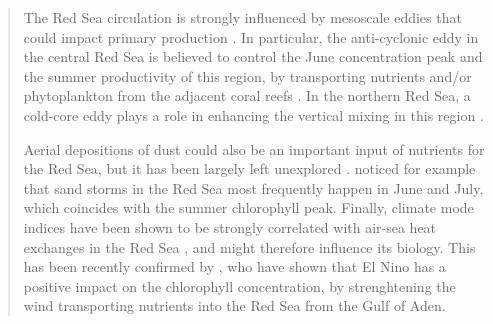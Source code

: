 \begin{quotation}
The Red Sea circulation is strongly influenced by mesoscale eddies
\citep{Yao2014, Yao2014b, Zhan2014} that could impact primary production
\citep{Zhai2013}.  In particular, the anti-cyclonic eddy in the central Red Sea
is believed to control the June concentration peak and the summer productivity
of this region, by transporting nutrients and/or phytoplankton from the
adjacent coral reefs \citep{Raitsos2013}. In the northern Red Sea, a cold-core
eddy plays a role in enhancing the vertical mixing in this region
\citep{Raitsos2013}.

Aerial depositions of dust could also be an important input of nutrients for
the Red Sea, but it has been largely left unexplored \citep{Triantafyllou2014}.
\citet{Raitsos2013} noticed for example that sand storms in the Red Sea most
frequently happen in June and July, which coincides with the summer chlorophyll
peak. Finally, climate mode indices have been shown to be strongly correlated
with air-sea heat exchanges in the Red Sea \citep{Abualnaja2015}, and might
therefore influence its biology. This has been recently confirmed by
\citet{Raitsos2015}, who have shown that El Nino has a positive impact on the
chlorophyll concentration, by strenghtening the wind transporting nutrients
into the Red Sea from the Gulf of Aden.  

\end{quotation}

